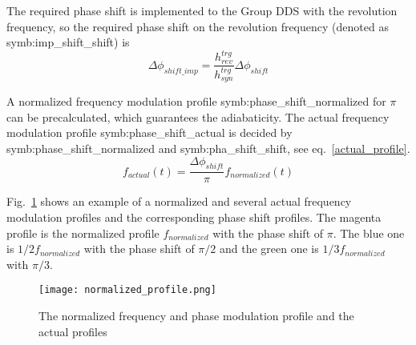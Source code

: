 The required phase shift is implemented to the Group DDS with the revolution frequency, so the required phase shift on the revolution frequency (denoted as \gls{symb:imp_shift_shift}) is 
\begin{equation}
\Delta \phi_\mathit{shift\_imp}= \frac{h_{\mathit{rev}}^{trg}}{h_{\mathit{syn}}^{trg}}\Delta \phi_\mathit{shift}
\end{equation}

A normalized frequency modulation profile \gls{symb:phase_shift_normalized} for $\pi$ can be precalculated, which guarantees the adiabaticity. The actual frequency modulation profile \gls{symb:phase_shift_actual} is decided by \gls{symb:phase_shift_normalized} and \gls{symb:pha_shift_shift}, see eq.~\ref{actual_profile}. 
\begin{equation}
f_{\mathit{actual}}(t)=\frac{\Delta \phi_\mathit{shift}}{\pi}f_{\mathit{normalized}}(t) \label{actual_profile}
\end{equation}

Fig.~\ref{normalized_profile} shows an example of a normalized and several actual frequency  modulation profiles and the corresponding phase shift profiles. The magenta profile is the normalized profile $f_{normalized}$ with the phase shift of $\pi$. The blue one is $1/2 f_{\mathit{normalized}}$ with the phase shift of $\pi/2$ and the green one is $1/3 f_{\mathit{normalized}}$ with $\pi/3$. 

\begin{figure}[!htb]
   \centering   
   \texttt{[image: normalized\_profile.png]}
   \caption{The normalized frequency and phase modulation profile and the actual profiles}
   \label{normalized_profile}
\end{figure}  

